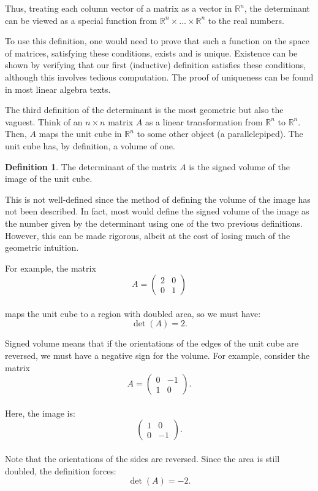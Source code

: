 \documentclass[
]{book}
\theoremstyle{definition}
\newtheorem{definition}{Definition}[chapter]
\theoremstyle{definition}
\theoremstyle{definition}
\theoremstyle{definition}
\theoremstyle{remark}
\begin{document}
Thus, treating each column vector of a matrix as a vector in \(\mathbb{R}^n\), the determinant can be viewed as a special function from \(\mathbb{R}^n \times \dots \times \mathbb{R}^n\) to the real numbers.

To use this definition, one would need to prove that such a function on the space of matrices, satisfying these conditions, exists and is unique. Existence can be shown by verifying that our first (inductive) definition satisfies these conditions, although this involves tedious computation. The proof of uniqueness can be found in most linear algebra texts.

The third definition of the determinant is the most geometric but also the vaguest. Think of an \(n \times n\) matrix \(A\) as a linear transformation from \(\mathbb{R}^n\) to \(\mathbb{R}^n\). Then, \(A\) maps the unit cube in \(\mathbb{R}^n\) to some other object (a parallelepiped). The unit cube has, by definition, a volume of one.

\begin{definition}
The determinant of the matrix \(A\) is the signed volume of the image of the unit cube.
\end{definition}

This is not well-defined since the method of defining the volume of the image has not been described. In fact, most would define the signed volume of the image as the number given by the determinant using one of the two previous definitions. However, this can be made rigorous, albeit at the cost of losing much of the geometric intuition.

For example, the matrix\\
\[ A = 
\begin{pmatrix} 
2 & 0 \\ 
0 & 1 
\end{pmatrix} 
\]\\
maps the unit cube to a region with doubled area, so we must have:\\
\[ \det(A) = 2. \]

Signed volume means that if the orientations of the edges of the unit cube are reversed, we must have a negative sign for the volume. For example, consider the matrix\\
\[ A = 
\begin{pmatrix} 
0 & -1 \\ 
1 & 0 
\end{pmatrix}. \]\\
Here, the image is:\\
\[ \begin{pmatrix} 
1 & 0 \\ 
0 & -1 
\end{pmatrix}. \]\\
Note that the orientations of the sides are reversed. Since the area is still doubled, the definition forces:\\
\[ \det(A) = -2. \]
\end{document}
